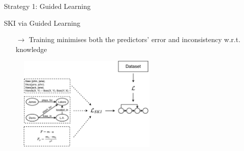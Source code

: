 \documentclass[presentation]{beamer}\mode<presentation>{\usetheme{AMSBolognaFC}}
\begin{document}
\begin{frame}[allowframebreaks]{Strategy 1: Guided Learning}
\begin{block}{SKI via Guided Learning}
\begin{enumerate}
            \medskip

            \item[$\rightarrow$] Training minimises both the predictors' \alert{error} and \alert{inconsistency} w.r.t. knowledge
        \end{enumerate}
    \end{block}
    \begin{figure}
        \centering
        \includegraphics[width=0.6\textwidth]{figures/ski-constraining}
    \end{figure}
     
\end{frame}
\end{document}
